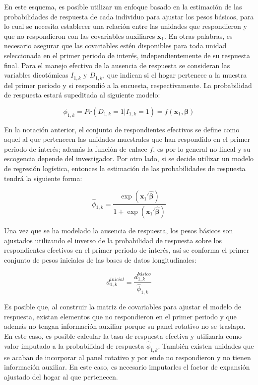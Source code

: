 \documentclass[
  12pt,
  spanish,
]{book}
\begin{document}
En este esquema, es posible utilizar un enfoque basado en la estimación de las probabilidades de respuesta de cada individuo para ajustar los pesos básicos, para lo cual se necesita establecer una relación entre las unidades que respondieron y que no respondieron con las covariables auxiliares \(\mathbf{x}_{1}\). En otras palabras, es necesario asegurar que las covariables estén disponibles para toda unidad seleccionada en el primer periodo de interés, independientemente de su respuesta final. Para el manejo efectivo de la ausencia de respuesta se consideran las variables dicotómicas \(I_{1, k}\) y \(D_{1, k}\), que indican si el hogar pertenece a la muestra del primer periodo y si respondió a la encuesta, respectivamente. La probabilidad de respuesta estará supeditada al siguiente modelo:

\[
\phi_{1, k} = Pr(D_{1, k} = 1|I_{1, k} = 1) = f(\mathbf{x}_{1}, \boldsymbol\beta)
\]

En la notación anterior, el conjunto de respondientes efectivos se define como aquel al que pertenecen las unidades muestrales que han respondido en el primer periodo de interés; además la función de enlace \(f\), es por lo general no lineal y su escogencia depende del investigador. Por otro lado, si se decide utilizar un modelo de regresión logística, entonces la estimación de las probabilidades de respuesta tendrá la siguiente forma:

\[
\hat{\phi}_{1, k} = \frac{\exp{(\mathbf{x}_{1}' \hat{\boldsymbol\beta})}}{1 +\exp{(\mathbf{x}_{1}' \hat{\boldsymbol\beta})}}
\]

Una vez que se ha modelado la ausencia de respuesta, los pesos básicos son ajustados utilizando el inverso de la probabilidad de respuesta sobre los respondientes efectivos en el primer periodo de interés, así se conforma el primer conjunto de pesos iniciales de las bases de datos longitudinales:

\[
d_{1, k}^{inicial} = \frac{d_{1, k}^{básico}}{\hat{\phi}_{1, k}}
\]

Es posible que, al construir la matriz de covariables para ajustar el modelo de respuesta, existan elementos que no respondieron en el primer periodo y que además no tengan información auxiliar porque su panel rotativo no se traslapa. En este caso, es posible calcular la tasa de respuesta efectiva y utilizarla como valor imputado a la probabilidad de respuesta \(\hat\phi_{1, k}\). También existen unidades que se acaban de incorporar al panel rotativo y por ende no respondieron y no tienen información auxiliar. En este caso, es necesario imputarles el factor de expansión ajustado del hogar al que pertenecen.
\end{document}
